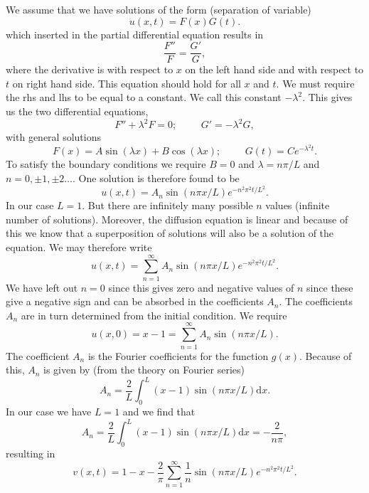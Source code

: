 \documentclass{article}
\begin{document}
 We assume that we have solutions of the form (separation of variable)
\[
u(x,t)=F(x)G(t).
\]
which inserted in the partial differential equation results in
\[
\frac{F''}{F}=\frac{G'}{G},
\]
where the derivative is with respect to $x$ on the left hand side and with respect to $t$ on right hand side.
This equation  should hold for all $x$ and $t$. We must require the rhs and lhs to be equal to a constant. 
We call this constant $-\lambda^2$. This gives us the two differential equations, 
\[
F''+\lambda^2F=0;  \hspace{1cm} G'=-\lambda^2G,
\]
with general solutions
\[
F(x)=A\sin(\lambda x)+B\cos(\lambda x); \hspace{1cm} G(t)=Ce^{-\lambda^2t}.
\]
To satisfy the boundary conditions we require $B=0$ and $\lambda=n\pi/L$ and $n=0,\pm 1,\pm 2\dots$. One solution is therefore found to be
\[
u(x,t)=A_n\sin(n\pi x/L)e^{-n^2\pi^2 t/L^2}.
\]
In our case $L=1$.
But there are infinitely many  possible $n$ values (infinite number of solutions). Moreover, 
the diffusion equation is linear and because of this we know that a superposition of solutions 
will also be a solution of the equation. We may therefore write
\[
u(x,t)=\sum_{n=1}^{\infty} A_n \sin(n\pi x/L) e^{-n^2\pi^2 t/L^2}.
\]
We have left out $n=0$ since this gives zero and negative values of $n$ since these give a negative sign and can be absorbed in the coefficients $A_n$.
The coefficients $A_n$ are in turn determined from the initial condition. We require
\[
u(x,0)=x-1=\sum_{n=1}^{\infty} A_n \sin(n\pi x/L).
\]
The coefficient $A_n$ is the Fourier coefficients for the function $g(x)$. Because of this, $A_n$ is given by (from the theory on Fourier series)
\[
A_n=\frac{2}{L}\int_0^L (x-1)\sin(n\pi x/L) \mathrm{d}x.
\]
In our case we have $L=1$ and we find that 
\[
A_n=\frac{2}{L}\int_0^L (x-1)\sin(n\pi x/L) \mathrm{d}x = -\frac{2}{n\pi},
\]
resulting in
\[
v(x,t) = 1-x -\frac{2}{\pi}\sum_{n=1}^{\infty} \frac{1}{n} \sin(n\pi x/L) e^{-n^2\pi^2 t/L^2}.
\]
\end{document}
